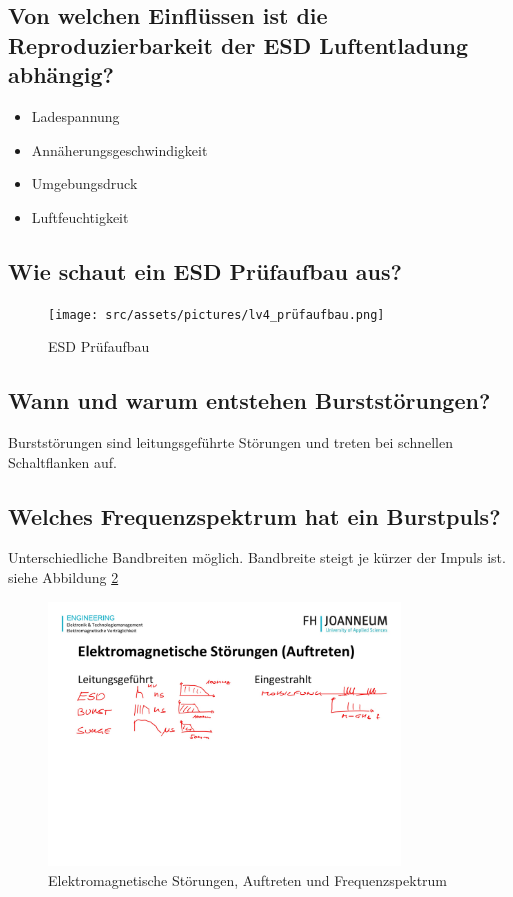 \begin{itemize}
\subsection{Von welchen Einflüssen ist die Reproduzierbarkeit der ESD Luftentladung abhängig?}
\begin{itemize}
  \item Ladespannung
  \item Annäherungsgeschwindigkeit
  \item Umgebungsdruck
  \item Luftfeuchtigkeit
\end{itemize}

\subsection{Wie schaut ein ESD Prüfaufbau aus?}
\begin{figure}[!ht]
  \centering
  \texttt{[image: src/assets/pictures/lv4\_prüfaufbau.png]}
  \caption{ESD Prüfaufbau}\label{fig:lv4:esd_test}
\end{figure}

\subsection{Wann und warum entstehen Burststörungen?}
Burststörungen sind leitungsgeführte Störungen und treten bei schnellen Schaltflanken auf.

\subsection{Welches Frequenzspektrum hat ein Burstpuls?}
Unterschiedliche Bandbreiten möglich. Bandbreite steigt je kürzer der Impuls ist.\\
siehe Abbildung \ref{fig:lv4:electro_interferences}
\begin{figure}[ht]
  \centering
  \includegraphics[height=7cm]{src/assets/pictures/lv4_elektromagnetische_stoerungen.jpg}
  \caption{Elektromagnetische Störungen, Auftreten und Frequenzspektrum}\label{fig:lv4:electro_interferences}
\end{figure}


\end{itemize}
